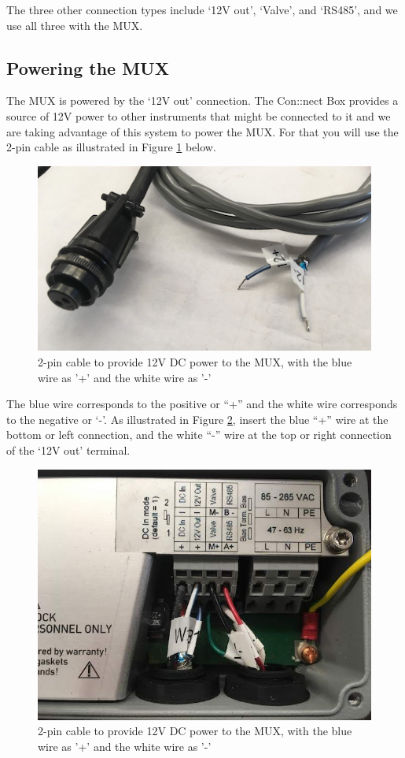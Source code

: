 \documentclass[]{book}
\begin{document}
The three other connection types include `12V out', `Valve', and `RS485', and we use all three with the MUX.

\hypertarget{powering-the-mux}{%
\subsection{Powering the MUX}\label{powering-the-mux}}

The MUX is powered by the `12V out' connection. The Con::nect Box provides a source of 12V power to other instruments that might be connected to it and we are taking advantage of this system to power the MUX. For that you will use the 2-pin cable as illustrated in Figure \ref{fig:2-pin-cable} below.

\begin{figure}

{\centering \includegraphics[width=0.7\linewidth]{pictures/2-pin-cable} 

}

\caption{2-pin cable to provide 12V DC power to the MUX, with the blue wire as '+' and the white wire as '-'}\label{fig:2-pin-cable}
\end{figure}

The blue wire corresponds to the positive or ``+'' and the white wire corresponds to the negative or `-'. As illustrated in Figure \ref{fig:ConnectBox1}, insert the blue ``+'' wire at the bottom or left connection, and the white ``-'' wire at the top or right connection of the `12V out' terminal.

\begin{figure}

{\centering \includegraphics[width=0.7\linewidth]{pictures/ConnectBox1} 

}

\caption{2-pin cable to provide 12V DC power to the MUX, with the blue wire as '+' and the white wire as '-'}\label{fig:ConnectBox1}
\end{figure}
\end{document}
